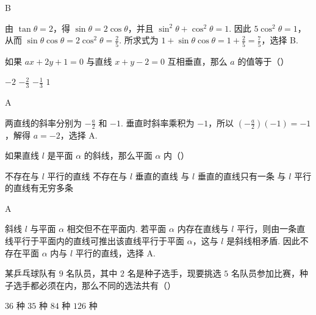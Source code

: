 \documentclass[UTF8,a4paper,oneside,11pt]{ctexbook}
\begin{document}
\begin{answer}
B
\end{answer}

\begin{solution}
由 \(\tan\theta=2\)，得 \(\sin\theta=2\cos\theta\)，并且 \(\sin^2\theta+\cos^2\theta=1\). 因此 \(5\cos^2\theta=1\)，从而 \(\sin\theta\cos\theta=2\cos^2\theta=\frac25\). 所求式为 \(1+\sin\theta\cos\theta=1+\frac25=\frac75\)，选择 B.
\end{solution}

\begin{problem}
如果 \(ax+2y+1=0\) 与直线 \(x+y-2=0\) 互相垂直，那么 \(a\) 的值等于（\quad）

\choices
    {\(-2\)}
    {\(-\frac{2}{3}\)}
    {\(-\frac{1}{3}\)}
    {\(1\)}
\end{problem}

\begin{answer}
A
\end{answer}

\begin{solution}
两直线的斜率分别为 \(-\frac{a}{2}\) 和 \(-1\). 垂直时斜率乘积为 \(-1\)，所以 \(\left(-\frac{a}{2}\right)(-1)=-1\)，解得 \(a=-2\)，选择 A.
\end{solution}

\begin{problem}
如果直线 \(l\) 是平面 \(\alpha\) 的斜线，那么平面 \(\alpha\) 内（\quad）

\choices
    {不存在与 \(l\) 平行的直线}
    {不存在与 \(l\) 垂直的直线}
    {与 \(l\) 垂直的直线只有一条}
    {与 \(l\) 平行的直线有无穷多条}
\end{problem}

\begin{answer}
A
\end{answer}

\begin{solution}
斜线 \(l\) 与平面 \(\alpha\) 相交但不在平面内. 若平面 \(\alpha\) 内存在直线与 \(l\) 平行，则由一条直线平行于平面内的直线可推出该直线平行于平面 \(\alpha\)，这与 \(l\) 是斜线相矛盾. 因此不存在平面 \(\alpha\) 内与 \(l\) 平行的直线，选择 A.
\end{solution}

\begin{problem}
某乒乓球队有 \(9\) 名队员，其中 \(2\) 名是种子选手，现要挑选 \(5\) 名队员参加比赛，种子选手都必须在内，那么不同的选法共有（\quad）

\choices
    {\(36\) 种}
    {\(35\) 种}
    {\(84\) 种}
    {\(126\) 种}
\end{problem}
\end{document}
